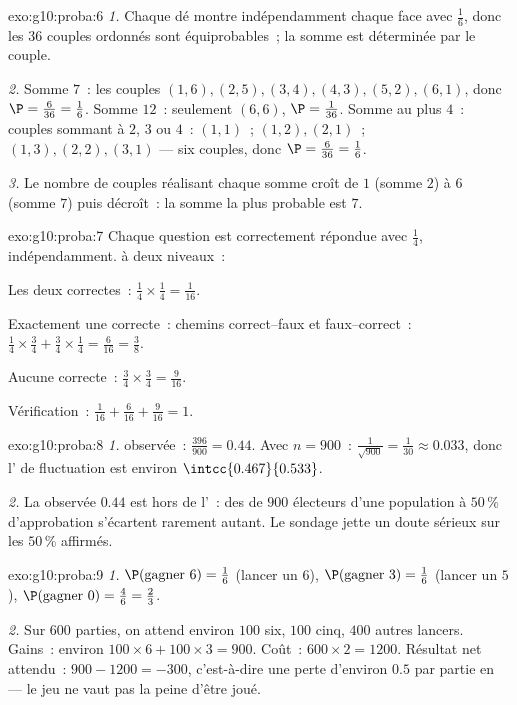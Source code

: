 \begin{solution}{exo:g10:proba:6}
\emph{1.} Chaque dé montre indépendamment chaque face avec 
$\frac16$, donc les $36$ couples ordonnés sont équiprobables~; la somme
est déterminée par le couple.

\emph{2.} Somme $7$~: les couples $(1,6), (2,5), (3,4), (4,3), (5,2),
(6,1)$, donc $\P = \frac{6}{36} = \frac16$. Somme $12$~: seulement
$(6,6)$, $\P = \frac{1}{36}$. Somme au plus $4$~: couples sommant à
$2$, $3$ ou $4$~: $(1,1)$~; $(1,2), (2,1)$~; $(1,3), (2,2), (3,1)$ ---
six couples, donc $\P = \frac{6}{36} = \frac16$.

\emph{3.} Le nombre de couples réalisant chaque somme croît de $1$
(somme $2$) à $6$ (somme $7$) puis décroît~: la somme la plus probable
est $7$.
\end{solution}

\begin{solution}{exo:g10:proba:7}
Chaque question est correctement répondue avec  $\frac14$,
indépendamment.  à deux niveaux~:

Les deux correctes~: $\frac14 \times \frac14 = \frac{1}{16}$.

Exactement une correcte~: chemins correct--faux et faux--correct~:
$\frac14 \times \frac34 + \frac34 \times \frac14 = \frac{6}{16}
= \frac38$.

Aucune correcte~: $\frac34 \times \frac34 = \frac{9}{16}$.

Vérification~: $\frac{1}{16} + \frac{6}{16} + \frac{9}{16} = 1$.
\end{solution}

\begin{solution}{exo:g10:proba:8}
\emph{1.}  observée~: $\frac{396}{900} = 0.44$. Avec
$n = 900$~: $\frac{1}{\sqrt{900}} = \frac{1}{30} \approx 0.033$, donc
l' de fluctuation est environ $\intcc{0.467}{0.533}$.

\emph{2.} La  observée $0.44$ est hors de l'~: des
 de $900$ électeurs d'une population à $50\,\%$ d'approbation
s'écartent rarement autant. Le sondage jette un doute sérieux sur les
$50\,\%$ affirmés.
\end{solution}

\begin{solution}{exo:g10:proba:9}
\emph{1.} $\P(\text{gagner } 6) = \frac16$ (lancer un $6$),
$\P(\text{gagner } 3) = \frac16$ (lancer un $5$),
$\P(\text{gagner } 0) = \frac46 = \frac23$.

\emph{2.} Sur $600$ parties, on attend environ $100$ six, $100$ cinq,
$400$ autres lancers. Gains~: environ
$100 \times 6 + 100 \times 3 = 900$. Coût~: $600 \times 2 = 1200$.
Résultat net attendu~: $900 - 1200 = -300$, c'est-à-dire une perte
d'environ $0.5$ par partie en  --- le jeu ne vaut pas la peine
d'être joué.
\end{solution}

